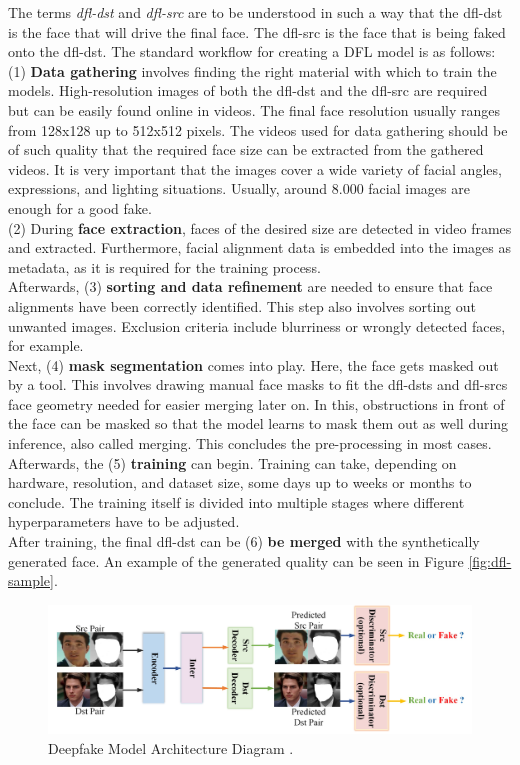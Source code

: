 \documentclass[
  a4paper,  %
  twoside,  %
  bibliography=totoc,
  headsepline,
  cleardoublepage=empty,
  parskip=half,
  draft=false
]{scrbook}
\begin{document}
The terms \textit{\gls{dfl-dst}} and \textit{\gls{dfl-src}} are to be understood in such a way that the \gls{dfl-dst} is the face that will drive the final face. The \gls{dfl-src} is the face that is being faked onto the \gls{dfl-dst}. The standard workflow for creating a DFL model is as follows: \\
(1) \textbf{Data gathering} involves finding the right material with which to train the models. High-resolution images of both the \gls{dfl-dst} and the \gls{dfl-src} are required but can be easily found online in videos. The final face resolution usually ranges from 128x128 up to 512x512 pixels. The videos used for data gathering should be of such quality that the required face size can be extracted from the gathered videos. It is very important that the images cover a wide variety of facial angles, expressions, and lighting situations. Usually, around 8.000 facial images are enough for a good fake. \\
(2) During \textbf{face extraction}, faces of the desired size are detected in video frames and extracted. Furthermore, facial alignment data is embedded into the images as metadata, as it is required for the training process. \\
Afterwards, (3) \textbf{sorting and data refinement} are needed to ensure that face alignments have been correctly identified. This step also involves sorting out unwanted images. Exclusion criteria include blurriness or wrongly detected faces, for example. \\
Next, (4) \textbf{mask segmentation} comes into play. Here, the face gets masked out by a tool. This involves drawing manual face masks to fit the \gls{dfl-dst}s and \gls{dfl-src}s face geometry needed for easier merging later on. In this, obstructions in front of the face can be masked so that the model learns to mask them out as well during inference, also called merging.  This concludes the pre-processing in most cases.\\
Afterwards, the (5) \textbf{training} can begin. Training can take, depending on hardware, resolution, and dataset size, some days up to weeks or months to conclude. The training itself is divided into multiple stages where different hyperparameters have to be adjusted. \\
After training, the final \gls{dfl-dst} can be (6) \textbf{be merged} with the synthetically generated face. An example of the generated quality can be seen in Figure \ref{fig:dfl-sample}.

\begin{figure}[h]
  \centering
  \includegraphics[width=1\textwidth]{./graphics/df-model-arch.png}
  \caption{Deepfake Model Architecture Diagram \cite{perovDeepFaceLabIntegratedFlexible2021}.}
  \label{fig:df-model-diagram}
\end{figure}
\end{document}

